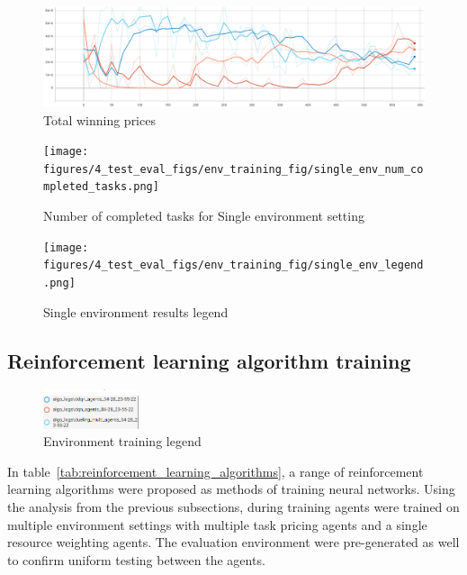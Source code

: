 \begin{figure}[H]
    \centering
    \includegraphics[width=\linewidth]{figures/4_test_eval_figs/env_training_fig/total_winning_prices.PNG}
    \caption{Total winning prices}
    \label{fig:env_winning_prices}
\end{figure}

\begin{figure}[H]
    \centering
    \begin{minipage}{0.75\linewidth}
        \centering
        \texttt{[image: figures/4\_test\_eval\_figs/env\_training\_fig/single\_env\_num\_completed\_tasks.png]}
        \caption{Number of completed tasks for Single environment setting}
        \label{fig:single_env_num_completed_tasks}
    \end{minipage}\hfill
    \begin{minipage}{0.25\linewidth}
        \centering
        \texttt{[image: figures/4\_test\_eval\_figs/env\_training\_fig/single\_env\_legend.png]}
        \caption{Single environment results legend}
        \label{fig:single_env_legend}
    \end{minipage}
\end{figure}


\subsection{Reinforcement learning algorithm training}\label{subsec:reinforcement-learning-algorithm-training}
\begin{figure}
    \includegraphics[width=0.25\textwidth]{figures/4_test_eval_figs/algo_training_fig/legend.PNG}
    \caption{Environment training legend}
    \label{fig:algo-training-legend}
\end{figure}

In table~\ref{tab:reinforcement_learning_algorithms}, a range of reinforcement learning algorithms were proposed as
methods of training neural networks. Using the analysis from the previous subsections, during training agents were
trained on multiple environment settings with multiple task pricing agents and a single resource weighting agents.
The evaluation environment were pre-generated as well to confirm uniform testing between the agents. \\

